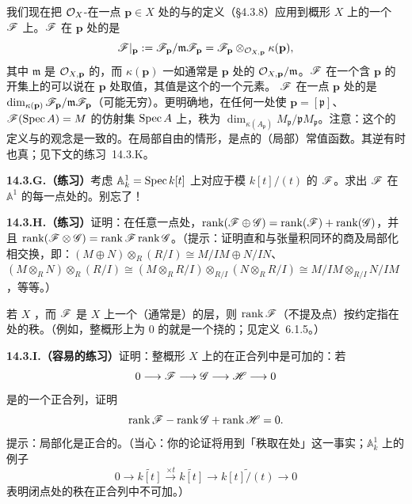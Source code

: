 我们现在把 $\mathcal{O}_X$-\trModule{}在一点 $\mathbf{p}\in X$ 处的\trFiber{}与\trRank{}的定义（\S4.3.8）应用到概形 $X$ 上的一个\trQCSheaf{} $\mathscr{F}$ 上。$\mathscr{F}$ 在 $\mathbf{p}$ 处的\emph{\trFiber}是\trVectorSpace
\[
\mathscr{F}|_{\mathbf{p}}:=\mathscr{F}_{\mathbf{p}}/\mathfrak{m}\mathscr{F}_{\mathbf{p}}=\mathscr{F}_{\mathbf{p}}\otimes_{\mathcal{O}_{X,\mathbf{p}}}\kappa(\mathbf{p}),
\]
其中 $\mathfrak{m}$ 是 $\mathcal{O}_{X,\mathbf{p}}$ 的\trMaximalIdeal，而 $\kappa(\mathbf{p})$ 一如通常是 $\mathbf{p}$ 处的\trResidueField{} $\mathcal{O}_{X,\mathbf{p}}/\mathfrak{m}$。$\mathscr{F}$ 在一个含 $\mathbf{p}$ 的开集上的\trSection{}可以说在 $\mathbf{p}$ 处取值，其值是这个\trVectorSpace{}的一个元素。\trQCSheaf{} $\mathscr{F}$ 在一点 $\mathbf{p}$ 处的\emph{\trRank}是 $\dim_{\kappa(\mathbf{p})}\mathscr{F}_{\mathbf{p}}/\mathfrak{m}\mathscr{F}_{\mathbf{p}}$（可能无穷）。更明确地，在任何一处使 $\mathbf{p}=[\mathfrak{p}]$、$\mathscr{F}(\operatorname{Spec} A)=M$ 的仿射集 $\operatorname{Spec} A$ 上，秩为 $\dim_{\kappa(A_{\mathfrak{p}})}M_{\mathfrak{p}}/\mathfrak{p}M_{\mathfrak{p}}$。注意：这个\trRank{}的定义与\trLocallyFreeSheaf{}的\trRank{}观念是一致的。在局部自由的情形，\trRank{}是点的（局部）常值函数。其逆有时也真；见下文的\mbox{练习~14.3.K}。

\textbf{14.3.G.（练习）}\quad 考虑 $\mathbb{A}^1_k=\operatorname{Spec} k[t]$ 上对应于模 $k[t]/(t)$ 的\trCoherentSheaf{} $\mathscr{F}$。求出 $\mathscr{F}$ 在 $\mathbb{A}^1$ 的每一点处的\trRank。别忘了\trGenericPoint！

\textbf{14.3.H.（练习）}\quad 证明：在任意一点处，$\operatorname{rank}(\mathscr{F}\oplus\mathscr{G})=\operatorname{rank}(\mathscr{F})+\operatorname{rank}(\mathscr{G})$，并且 $\operatorname{rank}(\mathscr{F}\otimes\mathscr{G})=\operatorname{rank}\mathscr{F}\operatorname{rank}\mathscr{G}$。（提示：证明直和与张量积同环的商及局部化相交换，即：$(M\oplus N)\otimes_R(R/I)\cong M/IM\oplus N/IN$、$(M\otimes_R N)\otimes_R(R/I)\cong(M\otimes_R R/I)\otimes_{R/I}(N\otimes_R R/I)\cong M/IM\otimes_{R/I}N/IM$，等等。）

若 $X$ \trIrreducible，而 $\mathscr{F}$ 是 $X$ 上一个\trQC{}（通常是\trCoh）的层，则 $\operatorname{rank}\mathscr{F}$（不提及点）按约定指在\trGenericPoint{}处的秩。（例如，整概形上\trRank{}为 $0$ 的\trQCSheaf{}就是一个挠的\trQCSheaf；见定义~6.1.5。）

\textbf{14.3.I.（容易的练习）}\quad 证明：整概形 $X$ 上\trCoherentSheaf{}的\trRank{}在正合列中是可加的：若
\[
0\longrightarrow\mathscr{F}\longrightarrow\mathscr{G}\longrightarrow\mathscr{H}\longrightarrow 0
\]
是\trCoherentSheaf{}的一个正合列，证明
\[
\operatorname{rank}\mathscr{F}-\operatorname{rank}\mathscr{G}+\operatorname{rank}\mathscr{H}=0.
\]
提示：局部化是正合的。（当心：你的论证将用到「秩取在\trGenericPoint{}处」这一事实；$\mathbb{A}^1_k$ 上的例子
\[
0\longrightarrow\widetilde{k[t]}\overset{\times t}{\longrightarrow}\widetilde{k[t]}\longrightarrow\widetilde{k[t]/(t)}\longrightarrow 0
\]
表明闭点处的秩在正合列中不可加。）

